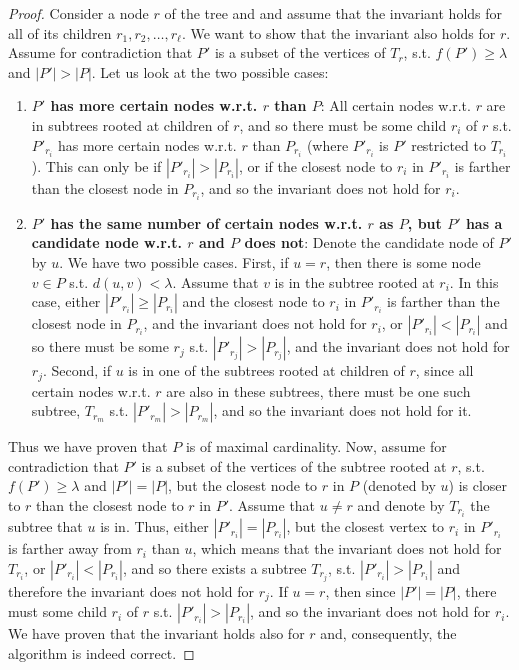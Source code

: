 \documentclass[11pt,a4paper]{article}
\theoremstyle{definition}
\theoremstyle{remark}
\begin{document}
\begin{proof}
Consider a node $r$ of the tree and and assume that the invariant holds for all of its children $r_{1},r_{2},\ldots,r_{\ell}$.
We want to show that the invariant also holds for $r$.
Assume for contradiction that $P'$ is a subset of the vertices of $T_r$, s.t. $f(P')\geq\lambda$ and $|P'| > |P|$. Let us look at the two possible cases:
\begin{enumerate}
\item \textbf{\boldmath$P'$ has more certain nodes w.r.t. \boldmath$r$ than \boldmath$P$}: All certain nodes w.r.t. $r$ are in subtrees rooted at children of $r$, and so there must be some child $r_{i}$ of $r$ s.t. $P'_{r_i}$ has more certain nodes w.r.t. $r$ than $P_{r_i}$ (where $P'_{r_i}$ is $P'$ restricted to $T_{r_i}$). This can only be if $|P'_{r_i}| > |P_{r_i}|$, or if the closest node to $r_i$ in $P'_{r_i}$ is farther than the closest node in $P_{r_i}$, and so the invariant does not hold for $r_i$.
\item \textbf{\boldmath$P'$ has the same number of certain nodes w.r.t. \boldmath$r$ as \boldmath$P$, but \boldmath$P'$ has a candidate node w.r.t. \boldmath$r$  and \boldmath$P$ does not}: Denote the candidate node of $P'$ by $u$. We have two possible cases. First, if $u=r$, then there is some node $v \in P$ s.t. $d(u,v)<\lambda$. Assume that $v$ is in the subtree rooted at $r_i$. In this case, either $|P'_{r_i}| \geq |P_{r_i}|$ and the closest node to $r_i$ in $P'_{r_i}$ is farther than the closest node in $P_{r_i}$, and the invariant does not hold for $r_i$, or $|P'_{r_i}|<|P_{r_i}|$ and so there must be some $r_j$ s.t. $|P'_{r_j}|>|P_{r_j}|$, and the invariant does not hold for $r_j$. Second, if $u$ is in one of the subtrees rooted at children of $r$, since all certain nodes w.r.t. $r$ are also in these subtrees, there must be one such subtree, $T_{r_m}$ s.t. $|P'_{r_m}| > |P_{r_m}|$, and so the invariant does not hold for it.
\end{enumerate} 
Thus we have proven that $P$ is of maximal cardinality. Now, assume for contradiction that $P'$ is a subset of the vertices of the subtree rooted at $r$, s.t. $f(P')\geq\lambda$ and $|P'| = |P|$, but the closest node to $r$ in $P$ (denoted by $u$) is closer to $r$ than the closest node to $r$ in $P'$. Assume that $u \neq r$ and denote by $T_{r_i}$ the subtree that $u$ is in. Thus, either $|P'_{r_i}| = |P_{r_i}|$, but the closest vertex to $r_i$ in $P'_{r_i}$ is farther away from $r_i$ than $u$, which means that the invariant does not hold for $T_{r_i}$, or $|P'_{r_i}| < |P_{r_i}|$, and so there exists a subtree $T_{r_j}$, s.t. $|P'_{r_i}| > |P_{r_i}|$ and therefore the invariant does not hold for $r_j$. If $u=r$, then since $|P'| = |P|$, there must some child $r_{i}$ of $r$ s.t. $|P'_{r_i}| > |P_{r_i}|$, and so the invariant does not hold for $r_i$. We have proven that the invariant holds also for $r$ and, consequently, the algorithm is indeed correct.
\end{proof}
\end{document}
